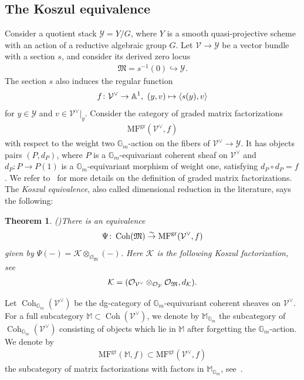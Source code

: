 \documentclass [11pt,oneside,a4paper,mathscr]{amsart}
\newtheorem{thm}{Theorem}[section]
\theoremstyle{definition}
\newcommand{\Y}{\mathcal{Y}}
\newcommand{\V}{\mathcal{V}}
\newcommand{\Coh}{\operatorname{Coh}}
\begin{document}
\subsection{The Koszul equivalence}\label{subsec:Koszuleq}
Consider a quotient stack $\Y=Y/G$, where $Y$ is a smooth quasi-projective scheme with 
an action of a reductive algebraic group $G$. 
Let $\mathcal{V} \to \mathcal{Y}$ be a vector 
bundle with a section $s$, and 
consider its derived zero locus
\begin{align}\label{funct:fV}
\mathfrak{M}=s^{-1}(0) \hookrightarrow \mathcal{Y}.
\end{align}
The section $s$ also induces the regular function \begin{equation}\notag
f\colon \mathcal{V}^{\vee} \to \mathbb{A}^1, \ 
(y, v)\mapsto \langle s(y), v\rangle
\end{equation}
for $y\in \mathcal{Y}$ and $v\in \mathcal{V}^{\vee}|_y$.
Consider the category of graded matrix factorizations \begin{align*}\text{MF}^{\text{gr}}\left(\mathscr{V}^{\vee}, f\right)
\end{align*}
with respect to the weight two $\mathbb{G}_m$-action on the fibers of $\mathcal{V}^{\vee} \to \mathcal{Y}$. 
It has objects pairs $(P, d_P)$, where $P$ is a $\mathbb{G}_m$-equivariant 
coherent sheaf on $\mathcal{V}^{\vee}$ and $d_P \colon P \to P(1)$ is a $\mathbb{G}_m$-equivariant morphism of weight one, satisfying $d_P \circ d_P=f$.
We refer to~\cite[Section~2.6.2]{PT0} for more details on the definition of graded matrix factorizations. 
The \textit{Koszul equivalence}, also called dimensional reduction in the literature, says the following:

\begin{thm}\emph{(\cite{I, Hirano, T})}\label{thm:Kduality}
There is an equivalence 
\begin{align}\notag
	\Psi \colon \Coh(\mathfrak{M})\stackrel{\sim}{\to}
	\mathrm{MF}^{\mathrm{gr}}(\mathcal{V}^{\vee}, f) 
	\end{align}
	given by $\Psi(-)=\mathcal{K}\otimes_{\mathcal{O}_{\mathfrak{M}}}(-)$. Here $\mathcal{K}$ is the following Koszul factorization, see~\cite[Theorem~2.3.3]{T}
    \begin{align}\notag
        \mathcal{K}=(\mathcal{O}_{\V^{\vee}}\otimes_{\mathcal{O}_{\Y}}\mathcal{O}_{\mathfrak{M}}, d_{\mathcal{K}}).
    \end{align}
	\end{thm}

Let $\Coh_{\mathbb{G}_m}(\V^{\vee})$ be the dg-category of $\mathbb{G}_m$-equivariant coherent 
sheaves on $\V^{\vee}$. 
    For a full subcategory $\mathbb{M} \subset \Coh(\V^{\vee})$, we denote by 
    $\mathbb{M}_{\mathbb{G}_m}$ the subcategory of $\Coh_{\mathbb{G}_m}(\V^{\vee})$ 
    consisting of objects which lie in $\mathbb{M}$ after forgetting the $\mathbb{G}_m$-action. 
    We denote by 
    \begin{align*}
        \mathrm{MF}^{\mathrm{gr}}(\mathbb{M}, f) \subset \mathrm{MF}^{\mathrm{gr}}(\V^{\vee}, f)
    \end{align*}
    the subcategory of matrix factorizations with factors in $\mathbb{M}_{\mathbb{G}_m}$, 
    see~\cite[Subsection~2.6.2]{PT0}. 
\end{document}
